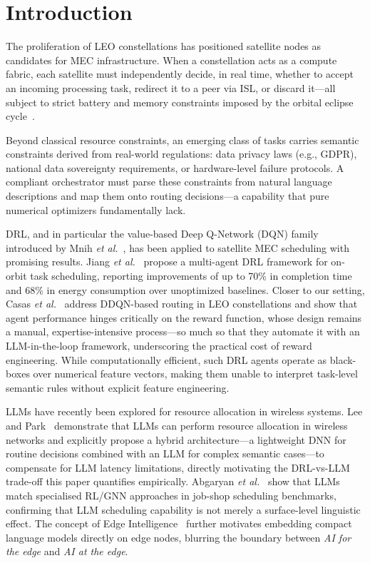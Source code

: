 \documentclass[conference,comsoc,twoside,caption=false]{IEEEtran}
\theoremstyle{definition}
\begin{document}
\section{Introduction}
\label{sec:intro}

The proliferation of \ac{LEO} constellations has positioned satellite nodes
as candidates for \ac{MEC} infrastructure. When a constellation acts as a
compute fabric, each satellite must independently decide, in real time, whether
to accept an incoming processing task, redirect it to a peer via \ac{ISL}, or
discard it---all subject to strict battery and memory constraints imposed by the
orbital eclipse cycle~\cite{guo2024,gpp2022}.

Beyond classical resource constraints, an emerging class of tasks carries
semantic constraints derived from real-world regulations: data privacy laws
(e.g., GDPR), national data sovereignty requirements, or hardware-level failure
protocols. A compliant orchestrator must parse these constraints from natural
language descriptions and map them onto routing decisions---a capability that
pure numerical optimizers fundamentally lack.

\ac{DRL}, and in particular the value-based Deep Q-Network (DQN) family
introduced by Mnih \emph{et al.}~\cite{mnih2015}, has been applied to satellite
MEC scheduling with promising results. Jiang \emph{et al.}~\cite{jiang2025}
propose a multi-agent DRL framework for on-orbit task scheduling, reporting
improvements of up to 70\% in completion time and 68\% in energy consumption
over unoptimized baselines. Closer to our setting, Casas \emph{et al.}~\cite{casas2026}
address DDQN-based routing in \ac{LEO} constellations and show that agent
performance hinges critically on the reward function, whose design remains a
manual, expertise-intensive process---so much so that they automate it with an
LLM-in-the-loop framework, underscoring the practical cost of reward
engineering. While computationally efficient, such DRL agents operate as
black-boxes over numerical feature vectors, making them unable to interpret
task-level semantic rules without explicit feature engineering.

\acp{LLM} have recently been explored for resource allocation in wireless
systems. Lee and Park~\cite{lee2024} demonstrate that LLMs can perform resource
allocation in wireless networks and explicitly propose a hybrid architecture---a
lightweight DNN for routine decisions combined with an LLM for complex semantic
cases---to compensate for LLM latency limitations, directly motivating the
DRL-vs-LLM trade-off this paper quantifies empirically. Abgaryan
\emph{et al.}~\cite{abgaryan2024} show that LLMs match specialised RL/GNN
approaches in job-shop scheduling benchmarks, confirming that LLM scheduling
capability is not merely a surface-level linguistic effect. The concept of
Edge Intelligence~\cite{deng2020} further motivates embedding compact language
models directly on edge nodes, blurring the boundary between \emph{AI for the
edge} and \emph{AI at the edge}.
\end{document}
